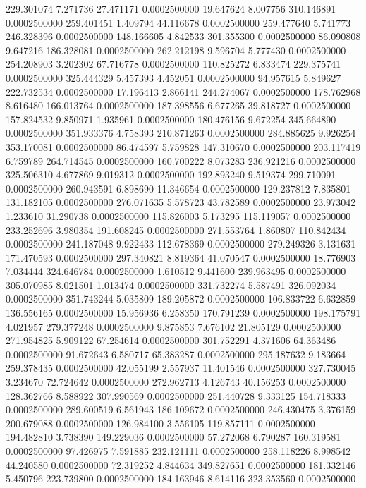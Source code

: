 229.301074 7.271736 27.471171 0.0002500000
19.647624 8.007756 310.146891 0.0002500000
259.401451 1.409794 44.116678 0.0002500000
259.477640 5.741773 246.328396 0.0002500000
148.166605 4.842533 301.355300 0.0002500000
86.090808 9.647216 186.328081 0.0002500000
262.212198 9.596704 5.777430 0.0002500000
254.208903 3.202302 67.716778 0.0002500000
110.825272 6.833474 229.375741 0.0002500000
325.444329 5.457393 4.452051 0.0002500000
94.957615 5.849627 222.732534 0.0002500000
17.196413 2.866141 244.274067 0.0002500000
178.762968 8.616480 166.013764 0.0002500000
187.398556 6.677265 39.818727 0.0002500000
157.824532 9.850971 1.935961 0.0002500000
180.476156 9.672254 345.664890 0.0002500000
351.933376 4.758393 210.871263 0.0002500000
284.885625 9.926254 353.170081 0.0002500000
86.474597 5.759828 147.310670 0.0002500000
203.117419 6.759789 264.714545 0.0002500000
160.700222 8.073283 236.921216 0.0002500000
325.506310 4.677869 9.019312 0.0002500000
192.893240 9.519374 299.710091 0.0002500000
260.943591 6.898690 11.346654 0.0002500000
129.237812 7.835801 131.182105 0.0002500000
276.071635 5.578723 43.782589 0.0002500000
23.973042 1.233610 31.290738 0.0002500000
115.826003 5.173295 115.119057 0.0002500000
233.252696 3.980354 191.608245 0.0002500000
271.553764 1.860807 110.842434 0.0002500000
241.187048 9.922433 112.678369 0.0002500000
279.249326 3.131631 171.470593 0.0002500000
297.340821 8.819364 41.070547 0.0002500000
18.776903 7.034444 324.646784 0.0002500000
1.610512 9.441600 239.963495 0.0002500000
305.070985 8.021501 1.013474 0.0002500000
331.732274 5.587491 326.092034 0.0002500000
351.743244 5.035809 189.205872 0.0002500000
106.833722 6.632859 136.556165 0.0002500000
15.956936 6.258350 170.791239 0.0002500000
198.175791 4.021957 279.377248 0.0002500000
9.875853 7.676102 21.805129 0.0002500000
271.954825 5.909122 67.254614 0.0002500000
301.752291 4.371606 64.363486 0.0002500000
91.672643 6.580717 65.383287 0.0002500000
295.187632 9.183664 259.378435 0.0002500000
42.055199 2.557937 11.401546 0.0002500000
327.730045 3.234670 72.724642 0.0002500000
272.962713 4.126743 40.156253 0.0002500000
128.362766 8.588922 307.990569 0.0002500000
251.440728 9.333125 154.718333 0.0002500000
289.600519 6.561943 186.109672 0.0002500000
246.430475 3.376159 200.679088 0.0002500000
126.984100 3.556105 119.857111 0.0002500000
194.482810 3.738390 149.229036 0.0002500000
57.272068 6.790287 160.319581 0.0002500000
97.426975 7.591885 232.121111 0.0002500000
258.118226 8.998542 44.240580 0.0002500000
72.319252 4.844634 349.827651 0.0002500000
181.332146 5.450796 223.739800 0.0002500000
184.163946 8.614116 323.353560 0.0002500000
